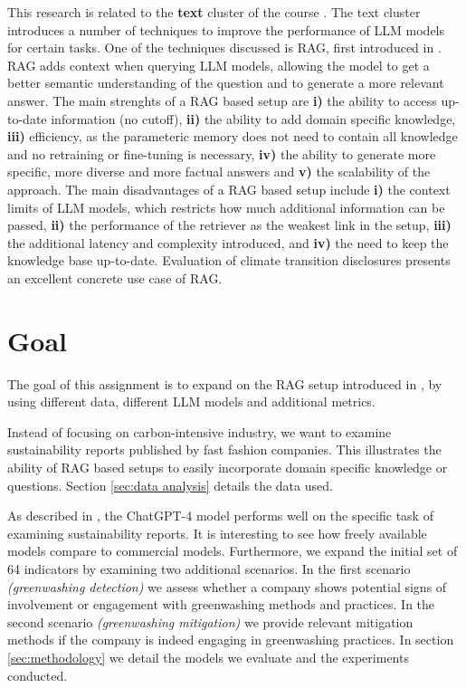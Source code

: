 \documentclass[]{article}
\begin{document}
This research is related to the \textbf{text} cluster of the course \cite{ou}.
The text cluster introduces a number of techniques to improve the performance of LLM models for certain tasks.
One of the techniques discussed is RAG, first introduced in \cite{rag}.
RAG adds context when querying LLM models, allowing the model to get a better semantic understanding of the question and to generate a more relevant answer.
The main strenghts of a RAG based setup are \textbf{i)} the ability to access up-to-date information (no cutoff), \textbf{ii)} the ability to add domain specific knowledge, \textbf{iii)} efficiency, as the parameteric memory does not need to contain all knowledge and no retraining or fine-tuning is necessary, \textbf{iv)} the ability to generate more specific, more diverse and more factual answers and \textbf{v)} the scalability of the approach.
The main disadvantages of a RAG based setup include \textbf{i)} the context limits of LLM models, which restricts how much additional information can be passed, \textbf{ii)} the performance of the retriever as the weakest link in the setup, \textbf{iii)} the additional latency and complexity introduced, and \textbf{iv)} the need to keep the knowledge base up-to-date.
Evaluation of climate transition disclosures presents an excellent concrete use case of RAG.

\section{Goal} \label{sec:goal}

The goal of this assignment is to expand on the RAG setup introduced in \cite{durability}, by using different data, different LLM models and additional metrics.

Instead of focusing on carbon-intensive industry, we want to examine sustainability reports published by fast fashion companies.
This illustrates the ability of RAG based setups to easily incorporate domain specific knowledge or questions.
Section \ref{sec:data analysis} details the data used.

As described in \cite{durability}, the ChatGPT-4 model performs well on the specific task of examining sustainability reports.
It is interesting to see how freely available models compare to commercial models.
Furthermore, we expand the initial set of 64 indicators by examining two additional scenarios.
In the first scenario \textit{(greenwashing detection)} we assess whether a company shows potential signs of involvement or engagement with greenwashing methods and practices.
In the second scenario \textit{(greenwashing mitigation)} we provide relevant mitigation methods if the company is indeed engaging in greenwashing practices.
In section \ref{sec:methodology} we detail the models we evaluate and the experiments conducted.
\end{document}
